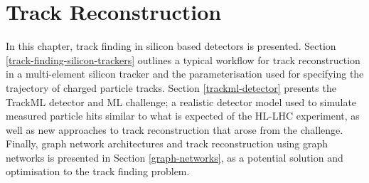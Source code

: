 
\doublespacing

\chapter{Track Reconstruction}
\label{chapter-3}




In this chapter, track finding in silicon based detectors is presented. Section \ref{track-finding-silicon-trackers} outlines a typical workflow for track reconstruction in a multi-element silicon tracker and the parameterisation used for specifying the trajectory of charged particle tracks. Section \ref{trackml-detector} presents the TrackML detector and ML challenge; a realistic detector model used to simulate measured particle hits similar to what is expected of the HL-LHC experiment, as well as new approaches to track reconstruction that arose from the challenge. Finally, graph network architectures and track reconstruction using graph networks is presented in Section \ref{graph-networks}, as a potential solution and optimisation to the track finding problem.

